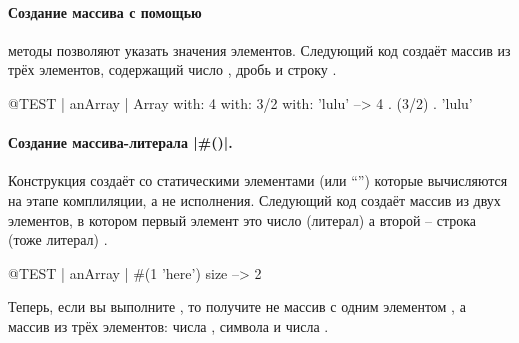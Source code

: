 \documentclass[a4paper,10pt,twoside]{book}
\begin{document}
\paragraph{Создание массива с помощью } методы  позволяют указать значения элементов.  
Следующий код создаёт массив из трёх элементов, содержащий число , дробь  и строку .

\begin{code}{@TEST | anArray |}
Array with: 4 with: 3/2 with: 'lulu' -->  {4 . (3/2) . 'lulu'}
\end{code}

\paragraph{Создание массива-литерала \ct|\#()|.}
Конструкция \ct{#()} создаёт  со статическими элементами (или ``'') которые вычисляются на этапе комплиляции, а не исполнения. Следующий код создаёт массив из двух элементов, в котором первый элемент это число (литерал)  а второй -- строка (тоже литерал) .


\begin{code}{@TEST | anArray |}
#(1 'here') size --> 2
\end{code}

Теперь, если вы выполните , то получите не массив с одним элементом , а массив  из трёх элементов: числа , символа \ct{#+} и числа .
\end{document}
